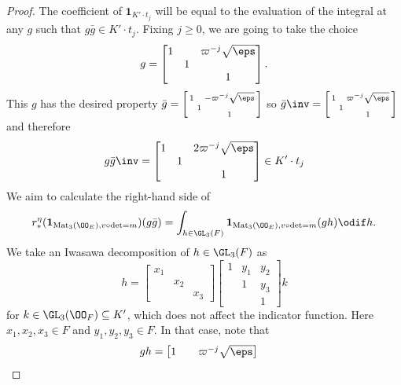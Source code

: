 \begin{proof}
  The coefficient of $\mathbf{1}_{K' \cdot t_j}$ will be equal to
  the evaluation of the integral at any $g$ such that $g\bar{g} \in K' \cdot t_j$.
  Fixing $j \ge 0$, we are going to take the choice
  \[
    g = \begin{bmatrix}
      1 &   & \varpi^{-j} \sqrt{\eps} \\
      & 1 \\
      &   & 1
    \end{bmatrix}.
  \]
  This $g$ has the desired property
  $\bar{g} = \left[ \begin{smallmatrix} 1 &   & -\varpi^{-j} \sqrt{\eps} \\ & 1 \\ &   & 1 \end{smallmatrix} \right]$
  so
  $\bar{g}\inv = \left[ \begin{smallmatrix} 1 &   & \varpi^{-j} \sqrt{\eps} \\ & 1 \\ &   & 1 \end{smallmatrix} \right]$
  and therefore
  \[
    g\bar{g}\inv = \begin{bmatrix}
      1 &   & 2\varpi^{-j} \sqrt{\eps} \\
      & 1 \\
      &   & 1
    \end{bmatrix} \in K' \cdot t_j
  \]
  We aim to calculate the right-hand side of
  \[
    r_\ast^\eta(\mathbf{1}_{\Mat_3(\OO_E), v\circ\det=m})(g\bar{g})
    = \int_{h \in \GL_3(F)} \mathbf{1}_{\Mat_3(\OO_E), v\circ\det=m}(gh) \odif h.
  \]
  We take an Iwasawa decomposition of $h \in \GL_3(F)$ as
  \[
    h =
    \begin{bmatrix} x_1 \\ & x_2 \\ && x_3 \end{bmatrix}
    \begin{bmatrix} 1 & y_1 & y_2 \\ & 1 & y_3 \\ & & 1 \end{bmatrix}
    k
  \]
  for $k \in \GL_3(\OO_F) \subseteq K'$, which does not affect the indicator function.
  Here $x_1, x_2, x_3 \in F$ and $y_1, y_2, y_3 \in F$.
  In that case, note that
  \begin{align*}
    gh
    &=
    \begin{bmatrix}
      1 &   & \varpi^{-j}\sqrt\eps \\

\end{bmatrix}
\end{align*}
\end{proof}
